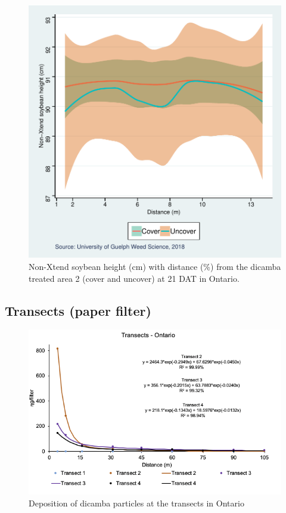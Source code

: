 \documentclass[]{article}
\begin{document}
\begin{figure}
\centering
\includegraphics{Report_files/figure-latex/unnamed-chunk-92-1.pdf}
\caption{Non-Xtend soybean height (cm) with distance (\%) from the
dicamba treated area 2 (cover and uncover) at 21 DAT in Ontario.}
\end{figure}

\pagebreak
\newpage

\subsection{Transects (paper filter)}\label{transects-paper-filter-4}

\begin{figure}[h]

{\centering \includegraphics[width=1\linewidth]{ONtransect} 

}

\caption{Deposition of dicamba particles at the transects in Ontario}\label{fig:unnamed-chunk-93}
\end{figure}
\end{document}
